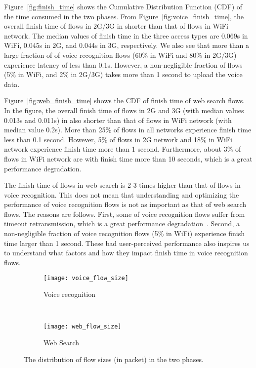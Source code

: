 Figure~\ref{fig:finish_time} shows the Cumulative Distribution Function (CDF) of the time consumed in the two phases. From Figure~\ref{fig:voice_finish_time}, the overall finish time of flows in 2G/3G in shorter than that of flows in WiFi network. The median values of finish time in the three access types are 0.069s in WiFi, 0.045s in 2G, and 0.044s in 3G, respectively. We also see that more than a large fraction of of voice recognition flows (60\% in WiFi and 80\% in 2G/3G) experience latency of less than 0.1s. However, a non-negligible fraction of flows (5\% in WiFi, and 2\% in 2G/3G) takes more than 1 second to upload the voice data.

Figure~\ref{fig:web_finish_time} shows the CDF of finish time of web search flows. In the figure, the overall finish time of flows in 2G and 3G (with median values 0.013s and 0.011s) in also shorter than that of flows in WiFi network (with median value 0.2s). More than 25\% of flows in all networks experience finish time less than 0.1 second. However, 5\% of flows in 2G network and 18\% in WiFi network experience finish time more than 1 second. Furthermore, about 3\% of flows in WiFi network are with finish time more than 10 seconds, which is a great performance degradation.

The finish time of flows in web search is 2-3 times higher than that of flows in voice recognition. This does not mean that understanding and optimizing the performance of voice recognition flows is not as important as that of web search flows. The reasons are follows. First, some of voice recognition flows suffer from timeout retransmission, which is a great performance degradation~\cite{flach2013reducing}. Second, a non-negligible fraction of voice recognition flows (5\% in WiFi) experience finish time larger than 1 second. These bad user-perceived performance also inspires us to understand what factors and how they impact finish time in voice recognition flows.

\begin{figure}[th]
\centering
\begin{subfigure}[b]{0.8\linewidth}
	\texttt{[image: voice\_flow\_size]}
\caption{Voice recognition}
\label{fig:voice_flow_size}
\end{subfigure} \\
\begin{subfigure}[b]{0.8\linewidth}
	\texttt{[image: web\_flow\_size]}
\caption{Web Search}
\label{fig:web_flow_size}
\end{subfigure}
\caption{The distribution of flow sizes (in packet) in the two phases.}
\label{fig:flow_size}
\end{figure}

